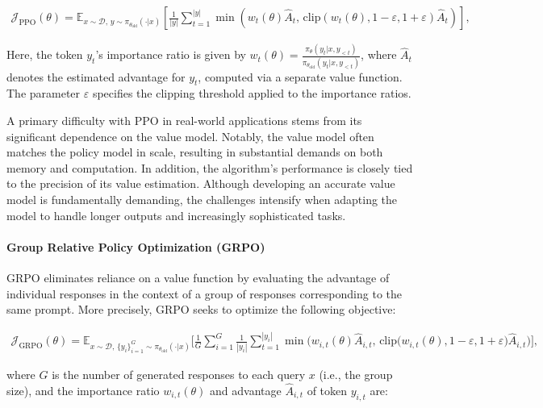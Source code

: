 \begin{align}
\mathcal{J}_\text{PPO}(\theta) = \mathbb{E}_{ x \sim \mathcal{D},\, y \sim \pi_{\theta_\text{old}}( \cdot | x) }
\left[ \frac{1}{|y|} \sum_{t=1}^{|y|} 
\min \left( w_{t}(\theta) \widehat{A}_{t},  \, \mathrm{clip} \left( w_{t}(\theta), 1 - {\varepsilon}, 1 + {\varepsilon}\right) \widehat{A}_{t} \right)
\right],
\end{align}

Here, the token $y_t$'s importance ratio is given by $
w_{t}(\theta) = \frac{ \pi_{\theta} (y_{t} | x, y_{<t}) }{ \pi_{\theta_\text{old}} (y_{t} | x,y_{<t})} $, where $\widehat{A}_{t}$ denotes the estimated advantage for $y_t$, computed via a separate value function. The parameter $\varepsilon$ specifies the clipping threshold applied to the importance ratios.

A primary difficulty with PPO in real-world applications stems from its significant dependence on the value model. Notably, the value model often matches the policy model in scale, resulting in substantial demands on both memory and computation. In addition, the algorithm's performance is closely tied to the precision of its value estimation. Although developing an accurate value model is fundamentally demanding, the challenges intensify when adapting the model to handle longer outputs and increasingly sophisticated tasks.

\paragraph{Group Relative Policy Optimization (GRPO)} GRPO \citep{grpo} eliminates reliance on a value function by evaluating the advantage of individual responses in the context of a group of responses corresponding to the same prompt. More precisely, GRPO seeks to optimize the following objective:

\begin{align}
\label{equ:grpo}
\mathcal{J}_\text{GRPO}(\theta) = \mathbb{E}_{ x \sim \mathcal{D},\, \{y_i\}_{i=1}^G \sim \pi_{\theta_\text{old}}( \cdot | x) }
\Bigg[ \frac{1}{G} \sum_{i=1}^{G} \frac{1}{|y_i|} \sum_{t=1}^{|y_i|} 
\min \Big( w_{i,t}(\theta) \widehat{A}_{i,t}, \,
\mathrm{clip} \big( w_{i,t}(\theta), 1 - {\varepsilon}, 1 + {\varepsilon}\big) \widehat{A}_{i,t} \Big)
\Bigg],
\end{align}

where $G$ is the number of generated responses to each query $x$ (i.e., the group size), and the importance ratio $w_{i,t}(\theta)$ and advantage $\widehat{A}_{i,t}$ of token $y_{i,t}$ are:

